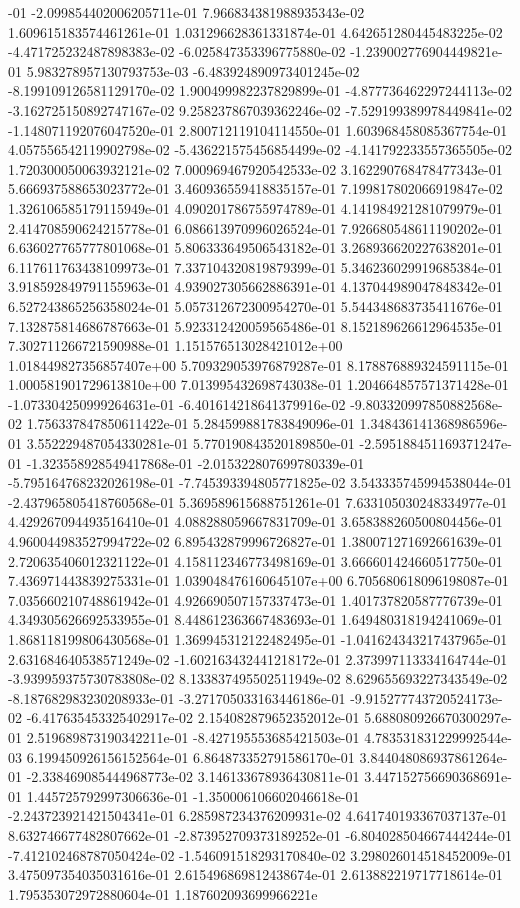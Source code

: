 -01	-2.099854402006205711e-01	7.966834381988935343e-02	1.609615183574461261e-01	1.031296628361331874e-01	4.642651280445483225e-02	-4.471725232487898383e-02	-6.025847353396775880e-02	-1.239002776904449821e-01	5.983278957130793753e-03	-6.483924890973401245e-02	-8.199109126581129170e-02	1.900499982237829899e-01	-4.877736462297244113e-02	-3.162725150892747167e-02	9.258237867039362246e-02	-7.529199389978449841e-02	-1.148071192076047520e-01	2.800712119104114550e-01	1.603968458085367754e-01	4.057556542119902798e-02	-5.436221575456854499e-02	-4.141792233557365505e-02	1.720300050063932121e-02	7.000969467920542533e-02	3.162290768478477343e-01	5.666937588653023772e-01	3.460936559418835157e-01	7.199817802066919847e-02	1.326106585179115949e-01	4.090201786755974789e-01	4.141984921281079979e-01	2.414708590624215778e-01	6.086613970996026524e-01	7.926680548611190202e-01	6.636027765777801068e-01	5.806333649506543182e-01	3.268936620227638201e-01	6.117611763438109973e-01	7.337104320819879399e-01	5.346236029919685384e-01	3.918592849791155963e-01	4.939027305662886391e-01	4.137044989047848342e-01	6.527243865256358024e-01	5.057312672300954270e-01	5.544348683735411676e-01	7.132875814686787663e-01	5.923312420059565486e-01	8.152189626612964535e-01	7.302711266721590988e-01	1.151576513028421012e+00	1.018449827356857407e+00	5.709329053976879287e-01	8.178876889324591115e-01	1.000581901729613810e+00	7.013995432698743038e-01	1.204664857571371428e-01	-1.073304250999264631e-01	-6.401614218641379916e-02	-9.803320997850882568e-02	1.756337847850611422e-01	5.284599881783849096e-01	1.348436141368986596e-01	3.552229487054330281e-01	5.770190843520189850e-01	-2.595188451169371247e-01	-1.323558928549417868e-01	-2.015322807699780339e-01	-5.795164768232026198e-01	-7.745393394805771825e-02	3.543335745994538044e-01	-2.437965805418760568e-01	5.369589615688751261e-01	7.633105030248334977e-01	4.429267094493516410e-01	4.088288059667831709e-01	3.658388260500804456e-01	4.960044983527994722e-02	6.895432879996726827e-01	1.380071271692661639e-01	2.720635406012321122e-01	4.158112346773498169e-01	3.666601424660517750e-01	7.436971443839275331e-01	1.039048476160645107e+00	6.705680618096198087e-01	7.035660210748861942e-01	4.926690507157337473e-01	1.401737820587776739e-01	4.349305626692533955e-01	8.448612363667483693e-01	1.649480318194241069e-01	1.868118199806430568e-01	1.369945312122482495e-01	-1.041624343217437965e-01	2.631684640538571249e-02	-1.602163432441218172e-01	2.373997113334164744e-01	-3.939959375730783808e-02	8.133837495502511949e-02	8.629655693227343549e-02	-8.187682983230208933e-01	-3.271705033163446186e-01	-9.915277743720524173e-02	-6.417635453325402917e-02	2.154082879652352012e-01	5.688080926670300297e-01	2.519689873190342211e-01	-8.427195553685421503e-01	4.783531831229992544e-03	6.199450926156152564e-01	6.864873352791586170e-01	3.844048086937861264e-01	-2.338469085444968773e-02	3.146133678936430811e-01	3.447152756690368691e-01	1.445725792997306636e-01	-1.350006106602046618e-01	-2.243723921421504341e-01	6.285987234376209931e-02	4.641740193367037137e-01	8.632746677482807662e-01	-2.873952709373189252e-01	-6.804028504667444244e-01	-7.412102468787050424e-02	-1.546091518293170840e-02	3.298026014518452009e-01	3.475097354035031616e-01	2.615496869812438674e-01	2.613882219717718614e-01	1.795353072972880604e-01	1.187602093699966221e